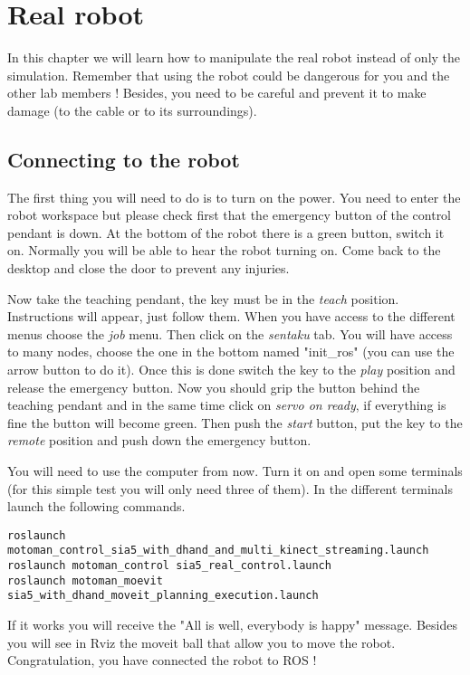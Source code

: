 \chapter{Real robot}

In this chapter we will learn how to manipulate the real robot instead of only the simulation. Remember that using the robot could be dangerous for you and the other lab members ! Besides, you need to be careful and prevent it to make damage (to the cable or to its surroundings).

\section{Connecting to the robot}

The first thing you will need to do is to turn on the power. You need to enter the robot workspace but please check first that the emergency button of the control pendant is down. At the bottom of the robot there is a green button, switch it on. Normally you will be able to hear the robot turning on. Come back to the desktop and close the door to prevent any injuries.

Now take the teaching pendant, the key must be in the \emph{teach} position. Instructions will appear, just follow them. When you have access to the different menus choose the \emph{job} menu. Then click on the \emph{sentaku} tab. You will have access to many nodes, choose the one in the bottom named "init\_ros" (you can use the arrow button to do it). Once this is done switch the key to the \emph{play} position and release the emergency button. Now you should grip the button behind the teaching pendant and in the same time click on \emph{servo on ready}, if everything is fine the button will become green. Then push the \emph{start} button, put the key to the \emph{remote} position and push down the emergency button.

You will need to use the computer from now. Turn it on and open some terminals (for this simple test you will only need three of them).  In the different terminals launch the following commands.

\begin{lstlisting}
roslaunch motoman_control_sia5_with_dhand_and_multi_kinect_streaming.launch
roslaunch motoman_control sia5_real_control.launch
roslaunch motoman_moevit sia5_with_dhand_moveit_planning_execution.launch
\end{lstlisting} 

If it works you will receive the "All is well, everybody is happy" message. Besides you will see in Rviz the moveit ball that allow you to move the robot. Congratulation, you have connected the robot to ROS !

